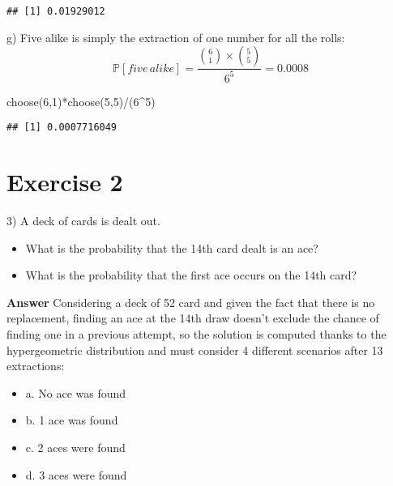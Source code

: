 \documentclass[
]{article}
\newenvironment{Shaded}{\begin{snugshade}}{\end{snugshade}}
\newcommand{\DecValTok}[1]{\textcolor[rgb]{0.00,0.00,0.81}{#1}}
\newcommand{\FunctionTok}[1]{\textcolor[rgb]{0.00,0.00,0.00}{#1}}
\newcommand{\NormalTok}[1]{#1}
\newcommand{\SpecialCharTok}[1]{\textcolor[rgb]{0.00,0.00,0.00}{#1}}
\providecommand{\tightlist}{%
  \setlength{\itemsep}{0pt}\setlength{\parskip}{0pt}}
\begin{document}
\begin{verbatim}
## [1] 0.01929012
\end{verbatim}

g) Five alike is simply the extraction of one number for all the rolls:
\[\mathbb P[five\, alike]=\frac{{6 \choose 1} \times {5 \choose 5}}{6^5}=0.0008\]

\begin{Shaded}
\begin{Highlighting}[]
\FunctionTok{choose}\NormalTok{(}\DecValTok{6}\NormalTok{,}\DecValTok{1}\NormalTok{)}\SpecialCharTok{*}\FunctionTok{choose}\NormalTok{(}\DecValTok{5}\NormalTok{,}\DecValTok{5}\NormalTok{)}\SpecialCharTok{/}\NormalTok{(}\DecValTok{6}\SpecialCharTok{\^{}}\DecValTok{5}\NormalTok{)}
\end{Highlighting}
\end{Shaded}

\begin{verbatim}
## [1] 0.0007716049
\end{verbatim}

\hypertarget{exercise-2}{%
\section{Exercise 2}\label{exercise-2}}

3) A deck of cards is dealt out.

\begin{itemize}
\tightlist
\item
  What is the probability that the 14th card dealt is an ace?
\item
  What is the probability that the first ace occurs on the 14th card?
\end{itemize}

\textbf{Answer} Considering a deck of 52 card and given the fact that
there is no replacement, finding an ace at the 14th draw doesn't exclude
the chance of finding one in a previous attempt, so the solution is
computed thanks to the hypergeometric distribution and must consider 4
different scenarios after 13 extractions:

\begin{itemize}
\tightlist
\item
  a. No ace was found
\item
  b. 1 ace was found
\item
  c. 2 aces were found
\item
  d. 3 aces were found
\end{itemize}
\end{document}
